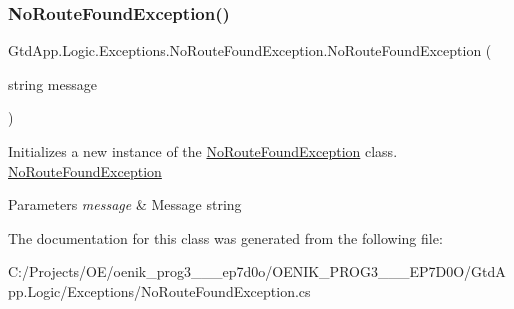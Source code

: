 \subsubsection{\texorpdfstring{No\+Route\+Found\+Exception()}{NoRouteFoundException()}\hspace{0.1cm}{\footnotesize\ttfamily [2/2]}}
{\footnotesize\ttfamily Gtd\+App.\+Logic.\+Exceptions.\+No\+Route\+Found\+Exception.\+No\+Route\+Found\+Exception (\begin{DoxyParamCaption}\item[{string}]{message }\end{DoxyParamCaption})}



Initializes a new instance of the \mbox{\hyperlink{class_gtd_app_1_1_logic_1_1_exceptions_1_1_no_route_found_exception}{No\+Route\+Found\+Exception}} class. \mbox{\hyperlink{class_gtd_app_1_1_logic_1_1_exceptions_1_1_no_route_found_exception}{No\+Route\+Found\+Exception}} 


\begin{DoxyParams}{Parameters}
{\em message} & Message string\\
\hline
\end{DoxyParams}


The documentation for this class was generated from the following file\+:\begin{DoxyCompactItemize}
\item 
C\+:/\+Projects/\+O\+E/oenik\+\_\+prog3\+\_\+\_\+\_\+ep7d0o/\+O\+E\+N\+I\+K\+\_\+\+P\+R\+O\+G3\+\_\+\_\+\_\+\+E\+P7\+D0\+O/\+Gtd\+App.\+Logic/\+Exceptions/No\+Route\+Found\+Exception.\+cs\end{DoxyCompactItemize}
